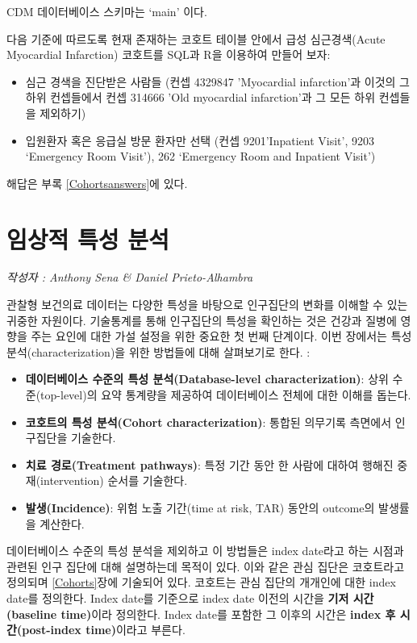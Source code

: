 \documentclass[11pt]{book}
\providecommand{\tightlist}{%
  \setlength{\itemsep}{0pt}\setlength{\parskip}{0pt}}
\theoremstyle{definition}
\theoremstyle{definition}
\theoremstyle{definition}
\theoremstyle{remark}
\let\BeginKnitrBlock\begin \let\EndKnitrBlock\end
\begin{document}
CDM 데이터베이스 스키마는 `main' 이다.

\BeginKnitrBlock{exercise}
\protect\hypertarget{exr:exerciseCohortsSql}{}{\label{exr:exerciseCohortsSql}
}다음 기준에 따르도록 현재 존재하는 코호트 테이블 안에서 급성
심근경색(Acute Myocardial Infarction) 코호트를 SQL과 R을 이용하여 만들어
보자:

\begin{itemize}
\tightlist
\item
  심근 경색을 진단받은 사람들 (컨셉 4329847 'Myocardial infarction'과
  이것의 그 하위 컨셉들에서 컨셉 314666 'Old myocardial infarction'과 그
  모든 하위 컨셉들을 제외하기)
\item
  입원환자 혹은 응급실 방문 환자만 선택 (컨셉 9201'Inpatient Visit',
  9203 `Emergency Room Visit'), 262 `Emergency Room and Inpatient
  Visit')
\end{itemize}
\EndKnitrBlock{exercise}

해답은 부록 \ref{Cohortsanswers}에 있다.

\chapter{임상적 특성 분석}\label{Characterization}

\emph{작성자 : Anthony Sena \& Daniel Prieto-Alhambra}

관찰형 보건의료 데이터는 다양한 특성을 바탕으로 인구집단의 변화를 이해할
수 있는 귀중한 자원이다. 기술통계를 통해 인구집단의 특성을 확인하는 것은
건강과 질병에 영향을 주는 요인에 대한 가설 설정을 위한 중요한 첫 번째
단계이다. 이번 장에서는 특성 분석(characterization)을 위한 방법들에 대해
살펴보기로 한다. :

\begin{itemize}
\tightlist
\item
  \textbf{데이터베이스 수준의 특성 분석(Database-level
  characterization)}: 상위 수준(top-level)의 요약 통계량을 제공하여
  데이터베이스 전체에 대한 이해를 돕는다.
\item
  \textbf{코호트의 특성 분석(Cohort characterization)}: 통합된 의무기록
  측면에서 인구집단을 기술한다.
\item
  \textbf{치료 경로(Treatment pathways)}: 특정 기간 동안 한 사람에
  대하여 행해진 중재(intervention) 순서를 기술한다.
\item
  \textbf{발생(Incidence)}: 위험 노출 기간(time at risk, TAR) 동안의
  outcome의 발생률을 계산한다.
\end{itemize}

데이터베이스 수준의 특성 분석을 제외하고 이 방법들은 index date라고 하는
시점과 관련된 인구 집단에 대해 설명하는데 목적이 있다. 이와 같은 관심
집단은 코호트라고 정의되며 \ref{Cohorts}장에 기술되어 있다. 코호트는
관심 집단의 개개인에 대한 index date를 정의한다. Index date를 기준으로
index date 이전의 시간을 \textbf{기저 시간(baseline time)}이라 정의한다.
Index date를 포함한 그 이후의 시간은 \textbf{index 후 시간(post-index
time)}이라고 부른다.
\end{document}
